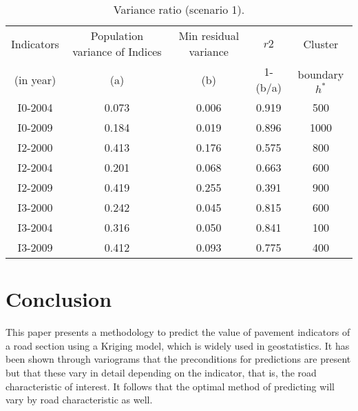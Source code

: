 \documentclass[Journal]{ascelike}
\begin{document}
\begin{table}[htbp]
\begin{center}
\caption{Variance ratio (scenario 1).}
\begin{tabular}{l|l|l|l|l}
\hline
\multicolumn{1}{c|}{Indicators} & \multicolumn{1}{c|}{Population variance  of Indices} & \multicolumn{1}{c|}{Min residual variance} & \multicolumn{1}{c|}{$r2$} & \multicolumn{1}{c}{Cluster} \\ 
\cline{2-4}
\multicolumn{1}{c|}{(in year)} & \multicolumn{1}{c|}{(a)} & \multicolumn{1}{c|}{(b)} & \multicolumn{1}{c|}{1-(b/a)} & \multicolumn{1}{c}{boundary $h^*$} \\ 
\hline
\multicolumn{1}{c|}{I0-2004} & \multicolumn{1}{c|}{0.073} & \multicolumn{1}{c|}{0.006} & \multicolumn{1}{c|}{0.919} & \multicolumn{1}{c}{500} \\ 
\multicolumn{1}{c|}{I0-2009} & \multicolumn{1}{c|}{0.184} & \multicolumn{1}{c|}{0.019} & \multicolumn{1}{c|}{0.896} & \multicolumn{1}{c}{1000} \\ 
\multicolumn{1}{c|}{I2-2000} & \multicolumn{1}{c|}{0.413} & \multicolumn{1}{c|}{0.176} & \multicolumn{1}{c|}{0.575} & \multicolumn{1}{c}{800} \\ 
\multicolumn{1}{c|}{I2-2004} & \multicolumn{1}{c|}{0.201} & \multicolumn{1}{c|}{0.068} & \multicolumn{1}{c|}{0.663} & \multicolumn{1}{c}{600} \\ 
\multicolumn{1}{c|}{I2-2009} & \multicolumn{1}{c|}{0.419} & \multicolumn{1}{c|}{0.255} & \multicolumn{1}{c|}{0.391} & \multicolumn{1}{c}{900} \\ 
\multicolumn{1}{c|}{I3-2000} & \multicolumn{1}{c|}{0.242} & \multicolumn{1}{c|}{0.045} & \multicolumn{1}{c|}{0.815} & \multicolumn{1}{c}{600} \\ 
\multicolumn{1}{c|}{I3-2004} & \multicolumn{1}{c|}{0.316} & \multicolumn{1}{c|}{0.050} & \multicolumn{1}{c|}{0.841} & \multicolumn{1}{c}{100} \\ 
\multicolumn{1}{c|}{I3-2009} & \multicolumn{1}{c|}{0.412} & \multicolumn{1}{c|}{0.093} & \multicolumn{1}{c|}{0.775} & \multicolumn{1}{c}{400} \\ 
\hline
\end{tabular}
\label{table7}
\end{center}
\end{table}

\section{Conclusion}\label{conclusion}
This paper presents a methodology to predict the value of pavement indicators of a road
section using a Kriging model, which is widely used in geostatistics. It has been shown
through variograms that the preconditions for predictions are present but that these vary in
detail depending on the indicator, that is, the road characteristic of interest. It follows that the
optimal method of predicting will vary by road characteristic as well.
\end{document}
